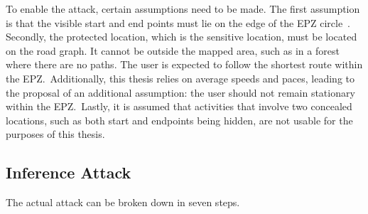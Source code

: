 \documentclass[conference]{IEEEtran}
\begin{document}
To enable the attack, certain assumptions need to be made. The first assumption
is that the visible start and end points must lie on the edge of the EPZ
circle~\cite{Dhondt}. Secondly, the protected location, which is the sensitive
location, must be located on the road graph. It cannot be outside the mapped
area, such as in a forest where there are no paths. The user is expected to
follow the shortest route within the EPZ.\ Additionally, this thesis relies on
average speeds and paces, leading to the proposal of an additional assumption:
the user should not remain stationary within the EPZ.\ Lastly, it is assumed
that activities that involve two concealed locations, such as both start and
endpoints being hidden, are not usable for the purposes of this thesis.

\subsection{Inference Attack}
The actual attack can be broken down in seven steps.
\end{document}
